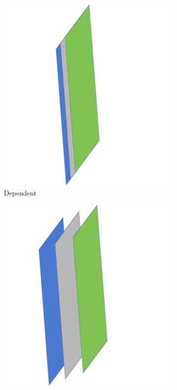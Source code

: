 \documentclass[10pt, journal, letterpaper]{IEEEtran}
\begin{document}
\begin{figure}
    \centering
    \begin{subfigure}{0.49\columnwidth}
          \centering
          \includegraphics[width=\columnwidth]{img/Dependent3D1.png}
          \caption{Dependent}
          \label{fig:linear_systems_dependant}
    \end{subfigure}
    \begin{subfigure}{0.49\columnwidth}
          \centering
          \includegraphics[width=\columnwidth]{img/Inconsistent3D1.png}

\end{subfigure}
\end{figure}
\end{document}
